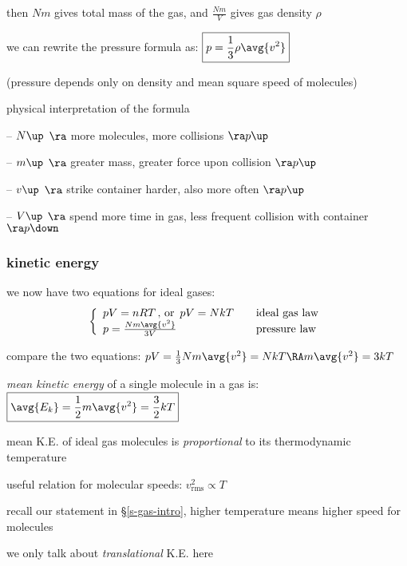 then $Nm$ gives total mass of the gas, and $\frac{Nm}{V}$ gives gas density $\rho$

we can rewrite the pressure formula as: $\boxed{p=\frac{1}{3}\rho \avg{v^2}}$ 

(pressure depends only on density and mean square speed of molecules)

\cmt physical interpretation of the formula

\begin{compactitem}
\item[--] $N \up$ $\ra$ more molecules, more collisions $\ra p\up$

\item[--] $m \up$ $\ra$ greater mass, greater force upon collision $\ra p\up$

\item[--] $v \up$ $\ra$ strike container harder, also more often $\ra p\up$

\item[--] $V \up$ $\ra$ spend more time in gas, less frequent collision with container $\ra p\down$
\end{compactitem}


\subsubsection{kinetic energy}

we now have two equations for ideal gases:
\begin{equation*}
\left\{
	\begin{array}{ll}
	pV = nRT \, \text{, or } \, pV = NkT &\quad \text{ideal gas law} \\
	p = \frac{Nm\avg{v^2}}{3V} &\quad \text{pressure law}
	\end{array} \right.
\end{equation*}

compare the two equations: $pV=\frac{1}{3}Nm\avg{v^2}=NkT \RA m\avg{v^2}=3kT$

\emph{mean kinetic energy} of a single molecule in a gas is: $\boxed{\avg{E_k}=\frac{1}{2}m\avg{v^2}=\frac{3}{2}kT}$

mean K.E. of ideal gas molecules is \emph{proportional} to its thermodynamic temperature

\cmt useful relation for molecular speeds: $\boxed{v_\text{rms}^2 \propto T}$

recall our statement in \S\ref{s-gas-intro}, higher temperature means higher speed for molecules

\cmt we only talk about \emph{translational} K.E. here

